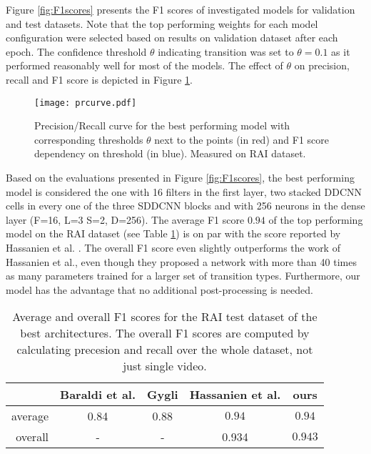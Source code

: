 Figure \ref{fig:F1scores} presents the F1 scores of investigated models for validation and test datasets. Note that the top performing weights for each model configuration were selected based on results on validation dataset after each epoch. The confidence threshold $\theta$ indicating transition was set to $\theta=0.1$ as it performed reasonably well for most of the models. The effect of $\theta$ on precision, recall and F1 score is depicted in Figure \ref{fig:prcurve}.

\begin{figure}
    \centering
    \texttt{[image: prcurve.pdf]}
    \caption{Precision/Recall curve for the best performing model with corresponding thresholds $\theta$ next to the points (in red) and F1 score dependency on threshold (in blue). Measured on RAI dataset.}
    \label{fig:prcurve}
\end{figure}

Based on the evaluations presented in Figure \ref{fig:F1scores}, the best performing model is considered the one with 16 filters in the first layer, two stacked DDCNN cells in every one of the three SDDCNN blocks and with 256 neurons in the dense layer (F=16, L=3 S=2, D=256).
The average F1 score $0.94$ of the top performing model on the RAI dataset (see Table \ref{tab:shotDetectors}) is on par with the score reported by Hassanien et al. \cite{Hassanien17}. The overall F1 score even slightly outperforms the work of Hassanien et al., even though they proposed a network with more than 40 times as many parameters trained for a larger set of transition types. Furthermore, our model has the advantage that no additional post-processing is needed.

\begin{table}[b]
    \centering
    \begin{tabular}{r|c|c|c|c}
        & Baraldi et al. & Gygli & Hassanien et al. & ours \\
        \hline
        average & 0.84 \cite{Baraldi15} & 0.88 \cite{Gygli18} & $\mathbf{0.94}$ \cite{Hassanien17} & $\mathbf{0.94}$ \\
        overall & - & - & 0.934 \cite{Hassanien17} & $\mathbf{0.943}$ \\
    \end{tabular}
    
    \caption{Average and overall F1 scores for the RAI test dataset of the best architectures. \textmd{The overall F1 scores are computed by calculating precesion and recall over the whole dataset, not just single video.
    }}
    \label{tab:shotDetectors}
\end{table}


